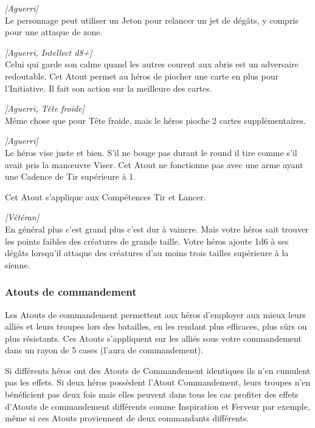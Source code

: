 \begin{description}[align=left]
    \item [Sans pitié]
    	\emph{[Aguerri]}\\
        Le personnage peut utiliser un Jeton pour relancer un jet de dégâts, y compris pour une attaque de zone.

    \item [Tête froide]
    	\emph{[Aguerri, Intellect d8+]}\\
        Celui qui garde son calme quand les autres courent aux abris est un adversaire redoutable. Cet Atout permet au héros de piocher une carte en plus pour l’Initiative. Il fait son action sur la meilleure des cartes.

    \item [Sang-froid]
    	\emph{[Aguerri, Tête froide]}\\
        Même chose que pour Tête froide, mais le héros pioche 2 cartes supplémentaires.

    \item [Tireur d’élite]
    	\emph{[Aguerri]}\\
        Le héros vise juste et bien. S’il ne bouge pas durant le round il tire comme s’il avait pris la man\oe{uvre} Viser. Cet Atout ne fonctionne pas avec une arme ayant une Cadence de Tir supérieure à 1.
		
		Cet Atout s’applique aux Compétences Tir et Lancer.

    \item [Tueur de géant]
    	\emph{[Vétéran]}\\
        En général plus c’est grand plus c’est dur à vaincre. Mais votre héros sait trouver les points faibles des créatures de grande taille. Votre héros ajoute 1d6 à ses dégâts lorsqu’il attaque des créatures d’au moins trois tailles supérieure à la sienne.

\end{description}

\newpage
\subsubsection{Atouts de commandement}
Les Atouts de commandement permettent aux héros d’employer aux mieux leurs alliés et leurs troupes lors des batailles, en les rendant plus efficaces, plus sûrs ou plus résistants. Ces Atouts s’appliquent sur les alliés sous votre commandement dans un rayon de 5 cases (l’aura de commandement). 

Si différents héros ont des Atouts de Commandement identiques ils n’en cumulent pas les effets. Si deux héros possèdent l’Atout Commandement, leurs troupes n’en bénéficient pas deux fois mais elles peuvent dans tous les cas profiter des effets d’Atouts de commandement différents comme Inspiration et Ferveur par exemple, même si ces Atouts proviennent de deux commandants différents.

